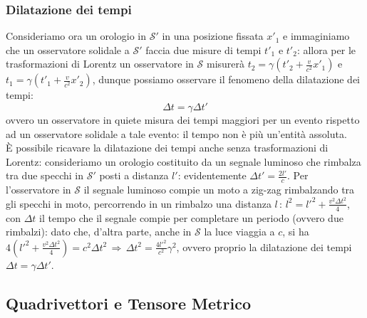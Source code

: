 \subsubsection{Dilatazione dei tempi}

Consideriamo ora un orologio in $ \mathcal{S}' $ in una posizione fissata $ x'_1 $ e immaginiamo che un osservatore solidale a $ \mathcal{S}' $ faccia due misure di tempi $ t'_1 $ e $ t'_2 $: allora per le trasformazioni di Lorentz un osservatore in $ \mathcal{S} $ misurerà $ t_2 = \gamma \left(t'_2 + \frac{v}{c^2} x'_1\right) $ e $ t_1 = \gamma \left(t'_1 + \frac{v}{c^2} x'_2\right) $, dunque possiamo osservare il fenomeno della dilatazione dei tempi:
\begin{equation}
	\Delta t = \gamma \Delta t'
	\label{eq:8}
\end{equation}
ovvero un osservatore in quiete misura dei tempi maggiori per un evento rispetto ad un osservatore solidale a tale evento: il tempo non è più un'entità assoluta. \\ 
%
È possibile ricavare la dilatazione dei tempi anche senza trasformazioni di Lorentz: consideriamo un orologio costituito da un segnale luminoso che rimbalza tra due specchi in $ \mathcal{S}' $ posti a distanza $ l' $: evidentemente $ \Delta t' = \frac{2l'}{c} $. Per l'osservatore in $ \mathcal{S} $ il segnale luminoso compie un moto a zig-zag rimbalzando tra gli specchi in moto, percorrendo in un rimbalzo una distanza $ l \,:\, l^2 = l'^2 + \frac{v^2 \Delta t^2}{4} $, con $ \Delta t $ il tempo che il segnale compie per completare un periodo (ovvero due rimbalzi): dato che, d'altra parte, anche in $ \mathcal{S} $ la luce viaggia a $ c $, si ha $ 4\left(l'^2 + \frac{v^2 \Delta t^2}{4}\right) = c^2 \Delta t^2 \, \Rightarrow \, \Delta t^2 = \frac{4l'^2}{c^2} \gamma^2 $, ovvero proprio la dilatazione dei tempi $ \Delta t = \gamma \Delta t' $.

\subsection{Quadrivettori e Tensore Metrico}

